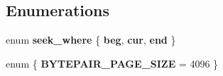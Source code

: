 \subsection*{Enumerations}
\begin{DoxyCompactItemize}
\item 
\mbox{\label{namespaceeka2l1_1_1common_a3e29e55a93b52960c1240e01f5c7cf8b}} 
enum {\bfseries seek\+\_\+where} \{ {\bfseries beg}, 
{\bfseries cur}, 
{\bfseries end}
 \}
\item 
\mbox{\label{namespaceeka2l1_1_1common_aa2dc2f971ac720c140dc795dfe2104fa}} 
enum \{ {\bfseries B\+Y\+T\+E\+P\+A\+I\+R\+\_\+\+P\+A\+G\+E\+\_\+\+S\+I\+ZE} = 4096
 \}
\end{DoxyCompactItemize}
